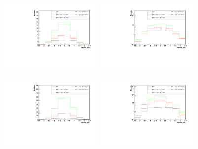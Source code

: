\begin{figure}[h]
  \begin{center}
	\includegraphics[width=0.45\textwidth]{Plots/aQGC_kinematics/lepton_eta_FT0.pdf}%
	\includegraphics[width=0.45\textwidth]{Plots/aQGC_kinematics/lepton_eta_FT0_log.pdf}\\				
    \caption{}
  \end{center}
\end{figure}

\begin{figure}[h]
  \begin{center}
	\includegraphics[width=0.45\textwidth]{Plots/aQGC_kinematics/lepton_eta_FT1.pdf}%
	\includegraphics[width=0.45\textwidth]{Plots/aQGC_kinematics/lepton_eta_FT1_log.pdf}\\				
    \caption{}
  \end{center}
\end{figure}

